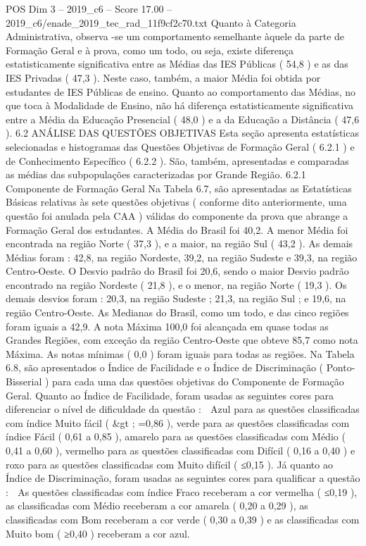 \begin{textsample}{POS Dim 3 – 2019\_c6 – Score 17.00 – 2019\_c6/enade\_2019\_tec\_rad\_11f9cf2c70.txt}
Quanto à Categoria Administrativa, observa -se um comportamento semelhante àquele da parte de Formação Geral e à prova, como um todo, ou seja, existe diferença estatisticamente significativa entre as Médias das IES Públicas ( 54,8 ) e as das IES Privadas ( 47,3 ).
Neste caso, também, a maior Média foi obtida por estudantes de IES Públicas de ensino.
Quanto ao comportamento das Médias, no que toca à Modalidade de Ensino, não há diferença estatisticamente significativa entre a Média da Educação Presencial ( 48,0 ) e a da Educação a Distância ( 47,6 ). 6.2 ANÁLISE DAS QUESTÕES OBJETIVAS Esta seção apresenta estatísticas selecionadas e histogramas das Questões Objetivas de Formação Geral ( 6.2.1 ) e de Conhecimento Específico ( 6.2.2 ).
São, também, apresentadas e comparadas as médias das subpopulações caracterizadas por Grande Região. 6.2.1 Componente de Formação Geral Na Tabela 6.7, são apresentadas as Estatísticas Básicas relativas às sete questões objetivas ( conforme dito anteriormente, uma questão foi anulada pela CAA ) válidas do componente da prova que abrange a Formação Geral dos estudantes.
A Média do Brasil foi 40,2.
A menor Média foi encontrada na região Norte ( 37,3 ), e a maior, na região Sul ( 43,2 ).
As demais Médias foram : 42,8, na região Nordeste, 39,2, na região Sudeste e 39,3, na região Centro-Oeste.
O Desvio padrão do Brasil foi 20,6, sendo o maior Desvio padrão encontrado na região Nordeste ( 21,8 ), e o menor, na região Norte ( 19,3 ).
Os demais desvios foram : 20,3, na região Sudeste ; 21,3, na região Sul ; e 19,6, na região Centro-Oeste.
As Medianas do Brasil, como um todo, e das cinco regiões foram iguais a 42,9.
A nota Máxima 100,0 foi alcançada em quase todas as Grandes Regiões, com exceção da região Centro-Oeste que obteve 85,7 como nota Máxima.
As notas mínimas ( 0,0 ) foram iguais para todas as regiões.
Na Tabela 6.8, são apresentados o Índice de Facilidade e o Índice de Discriminação ( Ponto-Bisserial ) para cada uma das questões objetivas do Componente de Formação Geral.
Quanto ao Índice de Facilidade, foram usadas as seguintes cores para diferenciar o nível de dificuldade da questão :  Azul para as questões classificadas com índice Muito fácil ( \&gt ; =0,86 ), verde para as questões classificadas com índice Fácil ( 0,61 a 0,85 ), amarelo para as questões classificadas com Médio ( 0,41 a 0,60 ), vermelho para as questões classificadas com Difícil ( 0,16 a 0,40 ) e roxo para as questões classificadas com Muito difícil ( ≤0,15 ).
Já quanto ao Índice de Discriminação, foram usadas as seguintes cores para qualificar a questão :  As questões classificadas com índice Fraco receberam a cor vermelha ( ≤0,19 ), as classificadas com Médio receberam a cor amarela ( 0,20 a 0,29 ), as classificadas com Bom receberam a cor verde ( 0,30 a 0,39 ) e as classificadas com Muito bom ( ≥0,40 ) receberam a cor azul.

\end{textsample}
